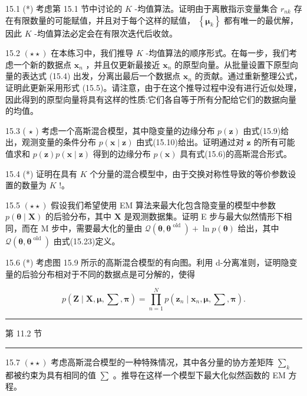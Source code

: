 \documentclass[10pt]{report}
\newcommand{\HRule}{\begin{center}\rule{0.9\linewidth}{0.2mm}\end{center}}
\begin{document}
15.1 (*) 考虑第 15.1 节中讨论的 \(K\) -均值算法。证明由于离散指示变量集合 \({r}_{nk}\) 存在有限数量的可能赋值，并且对于每个这样的赋值， \(\left\{  {\mathbf{\mu }}_{k}\right\}\) 都有唯一的最优解，因此 \(K\) -均值算法必定会在有限次迭代后收敛。

15.2 \(\left( {\star  \star  }\right)\) 在本练习中，我们推导 \(K\) -均值算法的顺序形式。在每一步，我们考虑一个新的数据点 \({\mathbf{x}}_{n}\) ，并且仅更新最接近 \({\mathbf{x}}_{n}\) 的原型向量。从批量设置下原型向量的表达式 (15.4) 出发，分离出最后一个数据点 \({\mathbf{x}}_{n}\) 的贡献。通过重新整理公式，证明此更新采用形式 (15.5)。请注意，由于在这个推导过程中没有进行近似处理，因此得到的原型向量将具有这样的性质:它们各自等于所有分配给它们的数据向量的均值。

15.3 ( \(\star\) ) 考虑一个高斯混合模型，其中隐变量的边缘分布 \(p\left( \mathbf{z}\right)\) 由式(15.9)给出，观测变量的条件分布 \(p\left( {\mathbf{x} \mid  \mathbf{z}}\right)\) 由式(15.10)给出。证明通过对 \(\mathbf{z}\) 的所有可能值求和 \(p\left( \mathbf{z}\right) p\left( {\mathbf{x} \mid  \mathbf{z}}\right)\) 得到的边缘分布 \(p\left( \mathbf{x}\right)\) 具有式(15.6)的高斯混合形式。

15.4 (*) 证明在具有 \(K\) 个分量的混合模型中，由于交换对称性导致的等价参数设置的数量为 \(K\) !。

15.5 \(\left( {\star  \star  }\right)\) 假设我们希望使用 EM 算法来最大化包含隐变量的模型中参数 \(p\left( {\mathbf{\theta } \mid  \mathbf{X}}\right)\) 的后验分布，其中 \(\mathbf{X}\) 是观测数据集。证明 E 步与最大似然情形下相同，而在 \(\mathrm{M}\) 步中，需要最大化的量由 \(\mathcal{Q}\left( {\mathbf{\theta },{\mathbf{\theta }}^{\text{ old }}}\right)  + \ln p\left( \mathbf{\theta }\right)\) 给出，其中 \(\mathcal{Q}\left( {\mathbf{\theta },{\mathbf{\theta }}^{\text{ old }}}\right)\) 由式(15.23)定义。

15.6 (*) 考虑图 15.9 所示的高斯混合模型的有向图。利用 d-分离准则，证明隐变量的后验分布相对于不同的数据点是可分解的，使得

\[
p\left( {\mathbf{Z} \mid  \mathbf{X},\mathbf{\mu },\mathbf{\sum },\mathbf{\pi }}\right)  = \mathop{\prod }\limits_{{n = 1}}^{N}p\left( {{\mathbf{z}}_{n} \mid  {\mathbf{x}}_{n},\mathbf{\mu },\mathbf{\sum },\mathbf{\pi }}\right) . \tag{15.62}
\]

\HRule

第 11.2 节

\HRule

15.7 \(\left( {\star  \star  }\right)\) 考虑高斯混合模型的一种特殊情况，其中各分量的协方差矩阵 \({\mathbf{\sum }}_{k}\) 都被约束为具有相同的值 \(\mathbf{\sum }\) 。推导在这样一个模型下最大化似然函数的 EM 方程。
\end{document}
